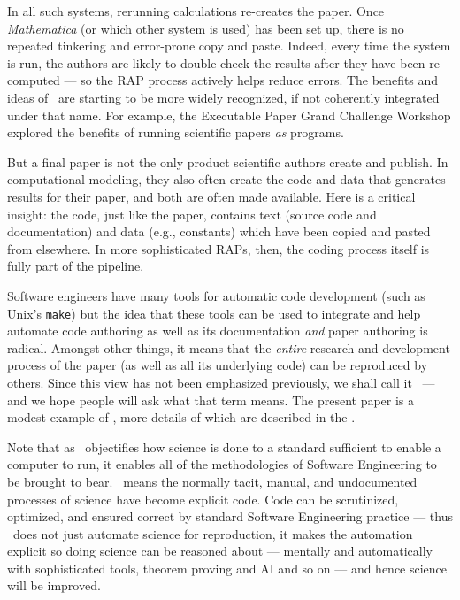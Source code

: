 \documentclass{comjnl}
\begin{document}
\begin{change}
In all such systems, rerunning calculations re-creates the paper. Once \emph{Mathematica\/} (or which other system is used) has been set up, there is no repeated tinkering and error-prone copy and paste. Indeed, every time the system is run, the authors are likely to double-check the results after they have been re-computed --- so the RAP process actively helps reduce errors. The benefits and ideas of \RAPstar\ are starting to be more widely recognized, if not coherently integrated under that name. For example, the Executable Paper Grand Challenge Workshop \cite{Executable-Paper} explored the benefits of running scientific papers \emph{as\/} programs. 

But a final paper is not the only product scientific authors create and publish. In computational modeling, they also often create the code and data that generates results for their paper, and both are often made available. Here is a critical insight: the code, just like the paper, contains text (source code and documentation) and data (e.g., constants) which have been copied and pasted from elsewhere. In more sophisticated RAPs, then, the coding process itself is fully part of the pipeline.

Software engineers have many tools for automatic code development (such as Unix's \texttt{make}) but the idea that these tools can be used to integrate and help automate code authoring as well as its documentation \emph{and\/} paper authoring is radical. Amongst other things, it means that the \emph{entire\/} research and development process of the paper (as well as all its underlying code) can be reproduced by others. Since this view has not been emphasized previously, we shall call it \RAPstar\ --- and we hope people will ask what that term means. The present paper is a modest example of \RAPstarp, more details of which are described in the \supplement. 

Note that as \RAPstar\ objectifies how science is done to a standard sufficient to enable a computer to run, it enables all of the methodologies of Software Engineering to be brought to bear. \RAPstar\ means the normally tacit, manual, and undocumented processes of science have become explicit code. Code can  be scrutinized, optimized, and ensured correct by standard Software Engineering practice --- thus \RAPstar\ does not just automate science for reproduction, it makes the automation explicit so doing science can be reasoned about --- mentally and automatically with sophisticated tools, theorem proving and AI and so on --- and hence science will be improved.
\end{change}
\end{document}
